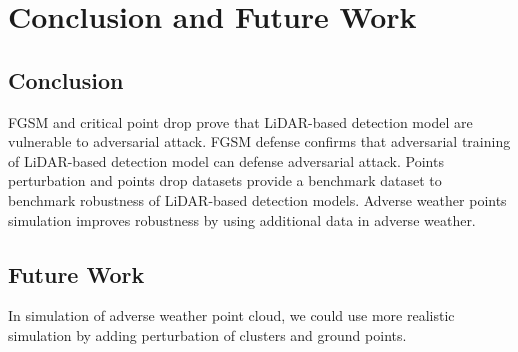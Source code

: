 
\chapter{Conclusion and Future Work}
\label{sec:conclusion_future-work}

\section{Conclusion}
FGSM and critical point drop prove that LiDAR-based detection model are vulnerable to adversarial attack. FGSM defense confirms that adversarial training of LiDAR-based detection model can defense adversarial attack. Points perturbation and points drop datasets provide a benchmark dataset to benchmark robustness of LiDAR-based detection models. Adverse weather points simulation improves robustness by using additional data in adverse weather.

\section{Future Work}
In simulation of adverse weather point cloud, we could use more realistic simulation by adding perturbation of clusters and ground points.

